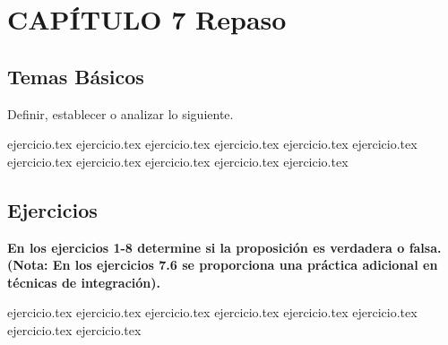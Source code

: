 \section*{CAPÍTULO 7 \quad Repaso}

\subsection*{Temas Básicos}
\noindent Definir, establecer o analizar lo siguiente.
\begin{enumerate}
    {ejercicio.tex}
{ejercicio.tex}
{ejercicio.tex}
{ejercicio.tex}
{ejercicio.tex}
{ejercicio.tex}
{ejercicio.tex}
{ejercicio.tex}
{ejercicio.tex}
{ejercicio.tex}
{ejercicio.tex}
\end{enumerate}

\subsection*{Ejercicios}

\noindent\textbf{En los ejercicios 1-8 determine si la proposición es verdadera o falsa. \\ (Nota: En los ejercicios 7.6 se proporciona una práctica adicional en técnicas de integración).}
\begin{enumerate}
    {ejercicio.tex}
{ejercicio.tex}
{ejercicio.tex}
{ejercicio.tex}
{ejercicio.tex}
{ejercicio.tex}
{ejercicio.tex}
{ejercicio.tex}
\end{enumerate}

